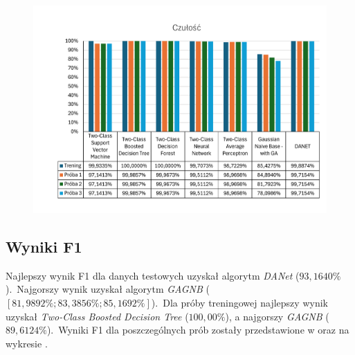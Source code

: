 \begin{figure}[H]
    \centering
    \includegraphics[width=\textwidth]{images/rec-res}
    \label{fig:rec-res}
\end{figure}

\subsection{Wyniki F1}
Najlepszy wynik F1 dla danych testowych uzyskał algorytm \textit{DANet} ($93,1640\%$).\ Najgorszy wynik uzyskał algorytm \textit{GAGNB} ($[81,9892\%; 83,3856\%; 85,1692\%]$).\ Dla próby treningowej najlepszy wynik uzyskał \textit{Two-Class Boosted Decision Tree} ($100,00\%$), a najgorszy \textit{GAGNB} ($89,6124\%$).\ Wyniki F1 dla poszczególnych prób zostały przedstawione w  oraz na wykresie .

